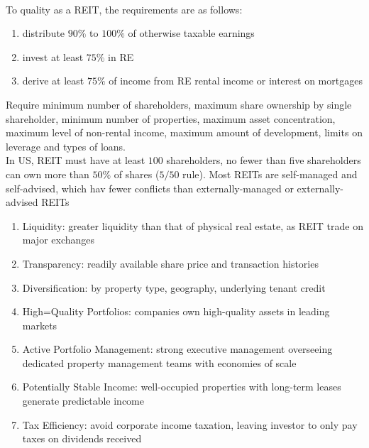 \begin{remark} \\
To quality as a REIT, the requirements are as follows:
\begin{enumerate}[label=\roman*.]
\setlength{\itemsep}{0pt}
\item distribute $90\%$ to $100\%$ of otherwise taxable earnings
\item invest at least $75\%$ in RE
\item derive at least $75\%$ of income from RE rental income or interest on mortgages
\end{enumerate}
Require minimum number of shareholders, maximum share ownership by single shareholder, minimum number of properties, maximum asset concentration, maximum level of non-rental income, maximum amount of development, limits on leverage and types of loans.\\
In US, REIT must have at least $100$ shareholders, no fewer than five shareholders can own more than $50\%$ of shares ($5/50$ rule). Most REITs are self-managed and self-advised, which hav fewer conflicts than externally-managed or externally-advised REITs
\end{remark}

\begin{remark} 
\begin{enumerate}[label=\roman*.]
\setlength{\itemsep}{0pt}
\item Liquidity: greater liquidity than that of physical real estate, as REIT trade on major exchanges
\item Transparency: readily available share price and transaction histories
\item Diversification: by property type, geography, underlying tenant credit
\item High=Quality Portfolios: companies own high-quality assets in leading markets
\item Active Portfolio Management: strong executive management overseeing dedicated property management teams with economies of scale
\item Potentially Stable Income: well-occupied properties with long-term leases generate predictable income
\item Tax Efficiency: avoid corporate income taxation, leaving investor to only pay taxes on dividends received
\end{enumerate}
\end{remark}

